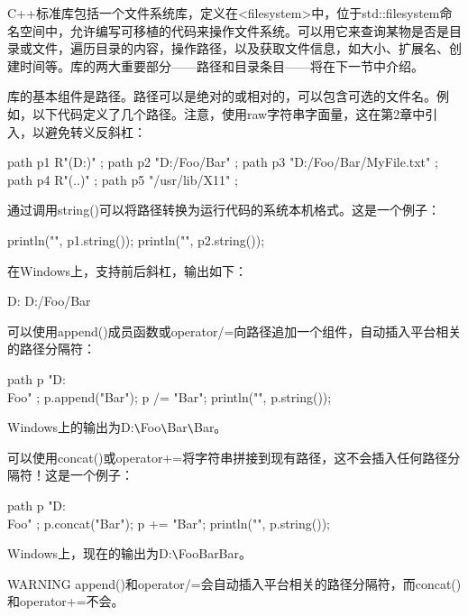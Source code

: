 
C++标准库包括一个文件系统库，定义在<filesystem>中，位于std::filesystem命名空间中，允许编写可移植的代码来操作文件系统。可以用它来查询某物是否是目录或文件，遍历目录的内容，操作路径，以及获取文件信息，如大小、扩展名、创建时间等。库的两大重要部分——路径和目录条目——将在下一节中介绍。


库的基本组件是路径。路径可以是绝对的或相对的，可以包含可选的文件名。例如，以下代码定义了几个路径。注意，使用raw字符串字面量，这在第2章中引入，以避免转义反斜杠：

\begin{cpp}
path p1 { R"(D:\Foo\Bar)" };
path p2 { "D:/Foo/Bar" };
path p3 { "D:/Foo/Bar/MyFile.txt" };
path p4 { R"(..\SomeFolder)" };
path p5 { "/usr/lib/X11" };
\end{cpp}

通过调用string()可以将路径转换为运行代码的系统本机格式。这是一个例子：

\begin{cpp}
println("{}", p1.string());
println("{}", p2.string());
\end{cpp}

在Windows上，支持前后斜杠，输出如下：

\begin{shell}
D:\Foo\Bar
D:/Foo/Bar
\end{shell}

可以使用append()成员函数或operator/=向路径追加一个组件，自动插入平台相关的路径分隔符：

\begin{cpp}
path p { "D:\\Foo" };
p.append("Bar");
p /= "Bar";
println("{}", p.string());
\end{cpp}

Windows上的输出为D:\verb|\|Foo\verb|\|Bar\verb|\|Bar。

可以使用concat()或operator+=将字符串拼接到现有路径，这不会插入任何路径分隔符！这是一个例子：

\begin{cpp}
path p { "D:\\Foo" };
p.concat("Bar");
p += "Bar";
println("{}", p.string());
\end{cpp}

Windows上，现在的输出为D:\verb|\|FooBarBar。

\begin{myWarning}{WARNING}
append()和operator/=会自动插入平台相关的路径分隔符，而concat()和operator+=不会。
\end{myWarning}

